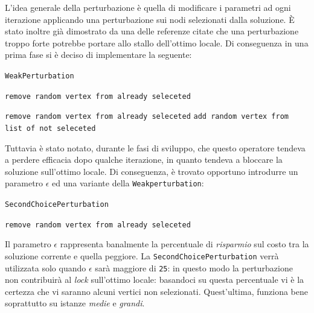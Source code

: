 \documentclass[11pt]{article}
\begin{document}
L'idea generale della perturbazione è quella di modificare i parametri ad ogni iterazione applicando una perturbazione sui nodi selezionati dalla soluzione.
È stato inoltre già dimostrato da una delle referenze citate che una perturbazione troppo forte potrebbe portare allo stallo dell'ottimo locale. Di conseguenza in una
prima fase si è deciso di implementare la seguente:

\begin{algorithm}
\caption{\texttt{WeakPerturbation}}
\begin{algorithmic}

\State\texttt{remove random vertex from already seleceted}

\Else{}
\State\texttt{remove random vertex from already seleceted}
\State\texttt{add random vertex from list of not seleceted}
\State{}
\EndIf{}

\end{algorithmic}
\end{algorithm}

Tuttavia è stato notato, durante le fasi di sviluppo, che questo operatore tendeva a perdere efficacia dopo qualche iterazione, in quanto tendeva a bloccare la soluzione sull'ottimo locale.
Di conseguenza, è trovato opportuno introdurre un parametro $\epsilon$ ed una variante della \texttt{Weakperturbation}:

\begin{algorithm}
    \caption{\texttt{SecondChoicePerturbation}}
    \begin{algorithmic}
    \State\texttt{remove random vertex from already seleceted}    
    \State{}

\end{algorithmic}
\end{algorithm}

Il parametro $\epsilon$ rappresenta banalmente la percentuale di \textit{risparmio} sul costo tra la soluzione corrente e quella peggiore.
La \texttt{SecondChoicePerturbation} verrà utilizzata solo quando $\epsilon$ sarà maggiore di \verb|25|: in questo modo la perturbazione non contribuirà al \textit{lock} sull'ottimo locale: basandoci su questa percentuale vi è la certezza che vi saranno alcuni vertici non selezionati.
Quest'ultima, funziona bene soprattutto su istanze \textit{medie} e \textit{grandi}.
\end{document}
